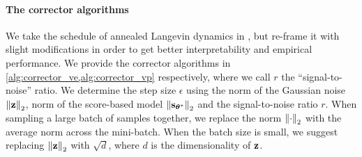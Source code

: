 \paragraph{The corrector algorithms} We take the schedule of annealed Langevin dynamics in \citet{song2019generative}, but re-frame it with slight modifications in order to get better interpretability and empirical performance. We provide the corrector algorithms in \cref{alg:corrector_ve,alg:corrector_vp} respectively, where we call $r$ the ``signal-to-noise'' ratio. We determine the step size $\epsilon$ using the norm of the Gaussian noise $\left\lVert\mathbf{z}\right\rVert_2$, norm of the score-based model $\left\lVert\mathbf{s}_{{\boldsymbol{\theta}}^*}\right\rVert_2$ and the signal-to-noise ratio $r$. When sampling a large batch of samples together, we replace the norm $\left\lVert\cdot\right\rVert_2$ with the average norm across the mini-batch. When the batch size is small, we suggest replacing $\left\lVert\mathbf{z}\right\rVert_2$ with $\sqrt{d}$, where $d$ is the dimensionality of $\mathbf{z}$. 



\begin{minipage}[t]{0.49\linewidth}
\begin{algorithm}[H]
	\caption{Corrector algorithm (VE SDE).}
	\label{alg:corrector_ve}
	\begin{algorithmic}[1]
            \EndFor
        \EndFor
        \item[]
	\end{algorithmic}
\end{algorithm}
\end{minipage}
\begin{minipage}[t]{0.49\linewidth}
\begin{algorithm}[H]
	\caption{Corrector algorithm (VP SDE).}
	\label{alg:corrector_vp}
	\begin{algorithmic}[1]
            \EndFor
        \EndFor
        \item[]
	\end{algorithmic}
\end{algorithm}
\end{minipage}


